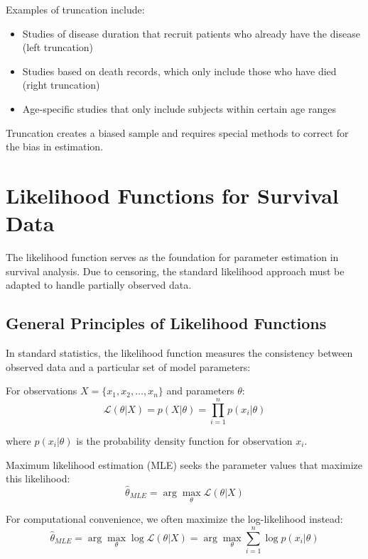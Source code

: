 Examples of truncation include:
\begin{itemize}
    \item Studies of disease duration that recruit patients who already have the disease (left truncation)
    \item Studies based on death records, which only include those who have died (right truncation)
    \item Age-specific studies that only include subjects within certain age ranges
\end{itemize}

Truncation creates a biased sample and requires special methods to correct for the bias in estimation.

\section{Likelihood Functions for Survival Data}

The likelihood function serves as the foundation for parameter estimation in survival analysis. Due to censoring, the standard likelihood approach must be adapted to handle partially observed data.

\subsection{General Principles of Likelihood Functions}

In standard statistics, the likelihood function measures the consistency between observed data and a particular set of model parameters:

\begin{equationbox}[title=Standard Likelihood Function]
For observations $X = \{x_1, x_2, \ldots, x_n\}$ and parameters $\theta$:
\begin{equation}
    \mathcal{L}(\theta | X) = p(X | \theta) = \prod_{i=1}^{n} p(x_i | \theta)
\end{equation}

where $p(x_i | \theta)$ is the probability density function for observation $x_i$.
\end{equationbox}

Maximum likelihood estimation (MLE) seeks the parameter values that maximize this likelihood:
\begin{equation}
    \hat{\theta}_{MLE} = \arg\max_{\theta} \mathcal{L}(\theta | X)
\end{equation}

For computational convenience, we often maximize the log-likelihood instead:
\begin{equation}
    \hat{\theta}_{MLE} = \arg\max_{\theta} \log\mathcal{L}(\theta | X) = \arg\max_{\theta} \sum_{i=1}^{n} \log p(x_i | \theta)
\end{equation}

